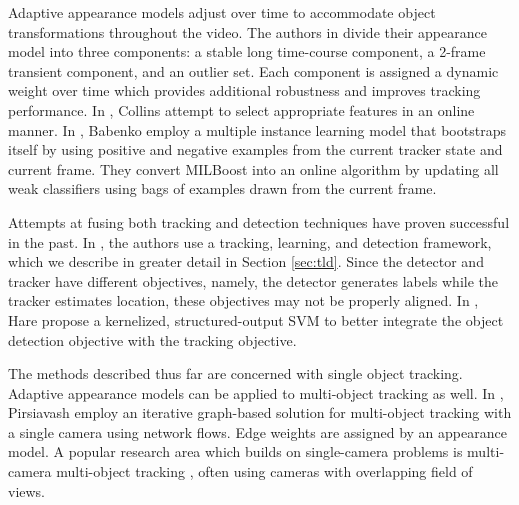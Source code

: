 \documentclass[10pt,twocolumn,letterpaper]{article}
\begin{document}
Adaptive appearance models adjust over time to accommodate object transformations throughout the video. The authors in \cite{jepson2003robust} divide their appearance model into three components: a stable long time-course component, a 2-frame transient component, and an outlier set. Each component is assigned a dynamic weight over time which provides additional robustness and improves tracking performance. In \cite{collins2005online}, Collins \etal attempt to select appropriate features in an online manner. In \cite{babenko2009visual}, Babenko \etal employ a multiple instance learning model that bootstraps itself by using positive and negative examples from the current tracker state and current frame. They convert MILBoost \cite{zhang2005multiple} into an online algorithm by updating all weak classifiers using bags of examples drawn from the current frame.

Attempts at fusing both tracking and detection techniques have proven successful in the past. In \cite{kalal2012tracking}, the authors use a tracking, learning, and detection framework, which we describe in greater detail in Section \ref{sec:tld}. Since the detector and tracker have different objectives, namely, the detector generates labels while the tracker estimates location, these objectives may not be properly aligned. In \cite{hare2011struck}, Hare \etal propose a kernelized, structured-output SVM to better integrate the object detection objective with the tracking objective.

The methods described thus far are concerned with single object tracking. Adaptive appearance models can be applied to multi-object tracking as well. In \cite{pirsiavash2011globally}, Pirsiavash \etal employ an iterative graph-based solution for multi-object tracking with a single camera using network flows. Edge weights are assigned by an appearance model. A popular research area which builds on single-camera problems is multi-camera multi-object tracking \cite{javed2003tracking, khan2003consistent}, often using cameras with overlapping field of views.
\end{document}
